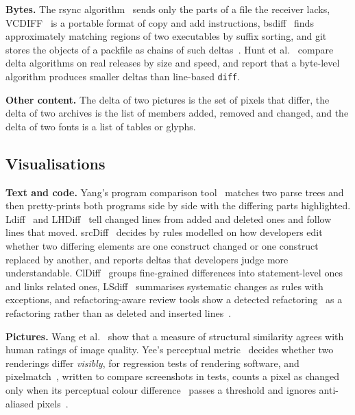 \documentclass[sigconf,review]{acmart}
\begin{document}
\textbf{Bytes.} The rsync
algorithm~\cite{tridgell-rsync} sends only the parts of a file the receiver lacks,
VCDIFF~\cite{vcdiff-rfc3284} is a portable format of copy and add instructions,
bsdiff~\cite{percival-bsdiff} finds approximately matching regions of two executables by suffix
sorting, and git stores the objects of a packfile as chains of such deltas~\cite{git-pack-format}.
Hunt et al.~\cite{hunt-vo-tichy-1998} compare delta algorithms on real releases by size and speed, and report that a byte-level algorithm produces
smaller deltas than line-based \texttt{diff}.

\textbf{Other content.} The delta of two pictures is the set of pixels that differ, the delta of two archives is the list
of members added, removed and changed, and the delta of two fonts is a list of tables or glyphs.

\subsection{Visualisations}
\label{sec:visualisations}

\textbf{Text and code.} Yang's program comparison tool~\cite{yang-1991} matches two parse trees
and then pretty-prints both programs side by side with the differing parts highlighted.
Ldiff~\cite{canfora-ldiff-2009} and LHDiff~\cite{asaduzzaman-lhdiff-2013} tell changed lines from
added and deleted ones and follow lines that moved. srcDiff~\cite{decker-2020} decides by rules
modelled on how developers edit whether two differing elements are one construct changed or one
construct replaced by another, and reports deltas that developers judge more understandable. ClDiff~\cite{cldiff-2018} groups fine-grained differences into statement-level
ones and links related ones, LSdiff~\cite{kim-notkin-2009} summarises systematic changes as rules
with exceptions, and refactoring-aware review tools show a detected
refactoring~\cite{refactoringminer-2022} as a refactoring rather than as deleted and inserted
lines~\cite{ge-2017,brito-2021}.

\textbf{Pictures.} Wang et al.~\cite{ssim-2004} show that a measure of structural similarity
agrees with human ratings of image quality. Yee's
perceptual metric~\cite{yee-2004} decides whether two renderings differ \emph{visibly}, for
regression tests of rendering software, and pixelmatch~\cite{pixelmatch}, written to compare
screenshots in tests, counts a pixel as changed only when its perceptual colour
difference~\cite{kotsarenko-2010} passes a threshold and ignores anti-aliased
pixels~\cite{vysniauskas-2009}.
\end{document}
